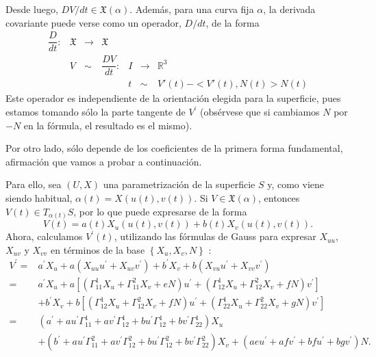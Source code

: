 \documentclass[openany]{book}
\begin{document}
\begin{demonstration}
  Desde luego, $D V / d t \in \mathfrak{X}(\alpha)$. Además, para una curva fija $\alpha$, la derivada covariante puede verse como un operador, $D / d t$, de la forma
  $$
  \begin{array}{lllllll}
    \dfrac{D}{dt} : &  \mathfrak{X} & \to & \mathfrak{X} &&&\\
    & V & \sim & \dfrac{DV}{dt}: & I & \to & \mathbb{R}^{ 3 } \\
    &&&&t & \sim & V'(t) - <V'(t), N(t)>N(t)
  \end{array}
  $$
Este operador es independiente de la orientación elegida para la superficie, pues estamos tomando sólo la parte tangente de $V^{\prime}$ (obsérvese que si cambiamos $N$ por $-N$ en la fórmula, el resultado es el mismo).

Por otro lado, sólo depende de los coeficientes de la primera forma fundamental, afirmación que vamos a probar a continuación.

Para ello, sea $(U, X)$ una parametrización de la superficie $S$ y, como viene siendo habitual, $\alpha(t)=X(u(t), v(t))$. Si $V \in \mathfrak{X}(\alpha)$, entonces $V(t) \in T_{\alpha(t)} S$, por lo que puede expresarse de la forma
$$
V(t)=a(t) X_{u}(u(t), v(t))+b(t) X_{v}(u(t), v(t)) .
$$
Ahora, calculamos $V^{\prime}(t)$, utilizando las fórmulas de Gauss para expresar $X_{u u}$, $X_{u v}$ y $X_{v v}$ en términos de la base $\left\{X_{u}, X_{v}, N\right\}$ :
$$
\begin{aligned}
V^{\prime}=& a^{\prime} X_{u}+a\left(X_{u u} u^{\prime}+X_{u v} v^{\prime}\right)+b^{\prime} X_{v}+b\left(X_{v u} u^{\prime}+X_{v v} v^{\prime}\right) \\
=& a^{\prime} X_{u}+a\left[\left(\Gamma_{11}^{1} X_{u}+\Gamma_{11}^{2} X_{v}+e N\right) u^{\prime}+\left(\Gamma_{12}^{1} X_{u}+\Gamma_{12}^{2} X_{v}+f N\right) v^{\prime}\right] \\
&+b^{\prime} X_{v}+b\left[\left(\Gamma_{12}^{1} X_{u}+\Gamma_{12}^{2} X_{v}+f N\right) u^{\prime}+\left(\Gamma_{22}^{1} X_{u}+\Gamma_{22}^{2} X_{v}+g N\right) v^{\prime}\right] \\
=&\left(a^{\prime}+a u^{\prime} \Gamma_{11}^{1}+a v^{\prime} \Gamma_{12}^{1}+b u^{\prime} \Gamma_{12}^{1}+b v^{\prime} \Gamma_{22}^{1}\right) X_{u} \\
&+\left(b^{\prime}+a u^{\prime} \Gamma_{11}^{2}+a v^{\prime} \Gamma_{12}^{2}+b u^{\prime} \Gamma_{12}^{2}+b v^{\prime} \Gamma_{22}^{2}\right) X_{v}+\left(a e u^{\prime}+a f v^{\prime}+b f u^{\prime}+b g v^{\prime}\right) N .
\end{aligned}
$$



\end{demonstration}
\end{document}
